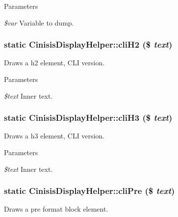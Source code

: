 \begin{DoxyParams}{Parameters}
\item[{\em \$var}]Variable to dump. \end{DoxyParams}
\hypertarget{classCinisisDisplayHelper_aa15ca1975a280814a1cdc2df82b8c67d}{
\subsubsection[{cliH2}]{\setlength{\rightskip}{0pt plus 5cm}static CinisisDisplayHelper::cliH2 (\$ {\em text})}}
\label{classCinisisDisplayHelper_aa15ca1975a280814a1cdc2df82b8c67d}
Draws a h2 element, CLI version.


\begin{DoxyParams}{Parameters}
\item[{\em \$text}]Inner text. \end{DoxyParams}
\hypertarget{classCinisisDisplayHelper_a1ed9ee357ffda8e2efd885a6eae20550}{
\subsubsection[{cliH3}]{\setlength{\rightskip}{0pt plus 5cm}static CinisisDisplayHelper::cliH3 (\$ {\em text})}}
\label{classCinisisDisplayHelper_a1ed9ee357ffda8e2efd885a6eae20550}
Draws a h3 element, CLI version.


\begin{DoxyParams}{Parameters}
\item[{\em \$text}]Inner text. \end{DoxyParams}
\hypertarget{classCinisisDisplayHelper_a50bf73bd3722766cbae1b46b3092453d}{
\subsubsection[{cliPre}]{\setlength{\rightskip}{0pt plus 5cm}static CinisisDisplayHelper::cliPre (\$ {\em text})}}
\label{classCinisisDisplayHelper_a50bf73bd3722766cbae1b46b3092453d}
Draws a pre format block element.


